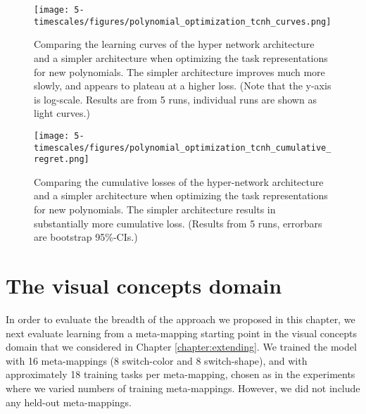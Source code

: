 \begin{figure}[p]
\centering
\texttt{[image: 5-timescales/figures/polynomial\_optimization\_tcnh\_curves.png]}
\caption[Comparing the learning curves of the hyper network architecture and a simpler architecture when optimizing the task representations for new polynomials.]{Comparing the learning curves of the hyper network architecture and a simpler architecture when optimizing the task representations for new polynomials. The simpler architecture improves much more slowly, and appears to plateau at a higher loss. (Note that the y-axis is log-scale. Results are from 5 runs, individual runs are shown as light curves.)} \label{fig:timescales_polynomial_optimization_tcnh_curves}
\end{figure}

\begin{figure}[p]
\centering
\texttt{[image: 5-timescales/figures/polynomial\_optimization\_tcnh\_cumulative\_regret.png]}
\caption[Comparing the cumulative losses of the hyper-network architecture and a simpler architecture when optimizing the task representations for new polynomials.]{Comparing the cumulative losses of the hyper-network architecture and a simpler architecture when optimizing the task representations for new polynomials. The simpler architecture results in substantially more cumulative loss. (Results from 5 runs, errorbars are bootstrap 95\%-CIs.)} \label{fig:timescales_polynomial_optimization_tcnh_regret}
\end{figure}
 

\section{The visual concepts domain}

In order to evaluate the breadth of the approach we proposed in this chapter, we next evaluate learning from a meta-mapping starting point in the visual concepts domain that we considered in Chapter \ref{chapter:extending}. We trained the model with 16 meta-mappings (8 switch-color and 8 switch-shape), and with approximately 18 training tasks per meta-mapping, chosen as in the experiments where we varied numbers of training meta-mappings. However, we did not include any held-out meta-mappings. 
